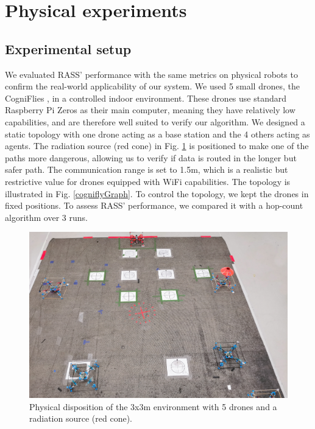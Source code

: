 \section{Physical experiments}
\label{Physical experiments}

\subsection{Experimental setup}
We evaluated \ac{RASS}' performance with the same
metrics on physical robots to confirm the real-world applicability of our system. We used 5 small drones, the CogniFlies \cite{de2021flexible}, in a controlled indoor environment. These drones use standard Raspberry Pi Zeros as their main computer, meaning they have relatively low capabilities, and are therefore well suited to verify our algorithm. We designed a static topology with one drone acting as a base station and the 4 others acting as agents. The radiation source (red cone) in Fig. \ref{cogniflyExperiment} is positioned to make one of the paths more dangerous, allowing us to verify if data is routed in the longer but safer path. The communication range is set to 1.5m, which is a realistic but restrictive value for drones equipped with WiFi capabilities. The topology is illustrated in Fig. \ref{cogniflyGraph}. To control the topology, we kept the drones in fixed positions. To assess \ac{RASS}' performance, we compared it with a hop-count algorithm over 3 runs.

\begin{figure}
    \includegraphics[width=16cm]{figures/dora_mesh/cognifly.jpg}
    \caption[RASS physical experiment setup]{Physical disposition of the 3x3m environment with 5 drones and a radiation source (red cone).}
    \label{cogniflyExperiment}
\end{figure}


